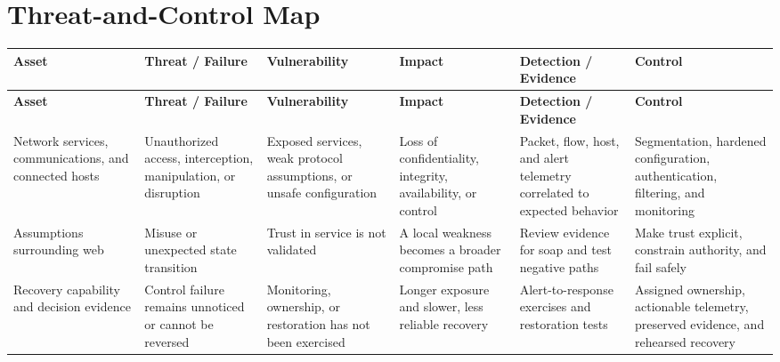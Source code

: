 \documentclass[11pt]{article}
\begin{document}
\section*{Threat-and-Control Map}
\begingroup\scriptsize\setlength{\tabcolsep}{2pt}
\begin{longtable}{>{\RaggedRight\arraybackslash}p{}>{\RaggedRight\arraybackslash}p{}>{\RaggedRight\arraybackslash}p{}>{\RaggedRight\arraybackslash}p{}>{\RaggedRight\arraybackslash}p{}>{\RaggedRight\arraybackslash}p{}}
\toprule\rowcolor{Navy}\color{white}\textbf{Asset} & \color{white}\textbf{Threat / Failure} & \color{white}\textbf{Vulnerability} & \color{white}\textbf{Impact} & \color{white}\textbf{Detection / Evidence} & \color{white}\textbf{Control}\\\midrule
\endfirsthead
\toprule\rowcolor{Navy}\color{white}\textbf{Asset} & \color{white}\textbf{Threat / Failure} & \color{white}\textbf{Vulnerability} & \color{white}\textbf{Impact} & \color{white}\textbf{Detection / Evidence} & \color{white}\textbf{Control}\\\midrule
\endhead
Network services, communications, and connected hosts & Unauthorized access, interception, manipulation, or disruption & Exposed services, weak protocol assumptions, or unsafe configuration & Loss of confidentiality, integrity, availability, or control & Packet, flow, host, and alert telemetry correlated to expected behavior & Segmentation, hardened configuration, authentication, filtering, and monitoring\\\midrule
Assumptions surrounding web & Misuse or unexpected state transition & Trust in service is not validated & A local weakness becomes a broader compromise path & Review evidence for soap and test negative paths & Make trust explicit, constrain authority, and fail safely\\\midrule
Recovery capability and decision evidence & Control failure remains unnoticed or cannot be reversed & Monitoring, ownership, or restoration has not been exercised & Longer exposure and slower, less reliable recovery & Alert-to-response exercises and restoration tests & Assigned ownership, actionable telemetry, preserved evidence, and rehearsed recovery\\\midrule
\bottomrule
\end{longtable}
\endgroup
\end{document}
